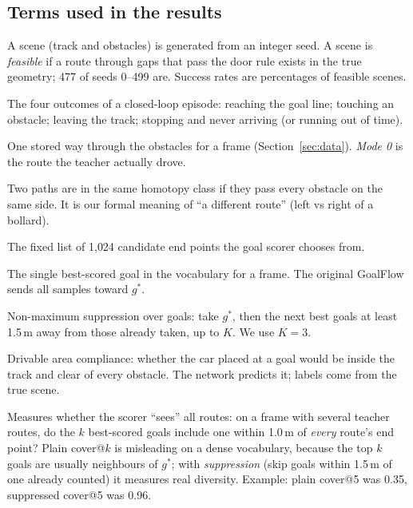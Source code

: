 \documentclass[11pt,a4paper]{article}
\begin{document}
\subsection{Terms used in the results}
\begin{description}[style=nextline,leftmargin=0pt]
  \item[Seed and feasible scene] A scene (track and obstacles) is generated from an integer seed. A scene is
        \emph{feasible} if a route through gaps that pass the door rule exists in the true geometry; 477 of
        seeds 0--499 are. Success rates are percentages of feasible scenes.
  \item[Success, collision, exit, stall] The four outcomes of a closed-loop episode: reaching the goal line;
        touching an obstacle; leaving the track; stopping and never arriving (or running out of time).
  \item[Mode, teacher route] One stored way through the obstacles for a frame (Section~\ref{sec:data}).
        \emph{Mode 0} is the route the teacher actually drove.
  \item[Homotopy] Two paths are in the same homotopy class if they pass every obstacle on the same side.
        It is our formal meaning of ``a different route'' (left vs right of a bollard).
  \item[Goal vocabulary] The fixed list of 1{,}024 candidate end points the goal scorer chooses from.
  \item[$g^*$ (``g-star'')] The single best-scored goal in the vocabulary for a frame. The original GoalFlow
        sends all samples toward $g^*$.
  \item[NMS-K] Non-maximum suppression over goals: take $g^*$, then the next best goals at least 1.5\,m away
        from those already taken, up to $K$. We use $K=3$.
  \item[DAC] Drivable area compliance: whether the car placed at a goal would be inside the track and clear
        of every obstacle. The network predicts it; labels come from the true scene.
  \item[cover@$k$] Measures whether the scorer ``sees'' all routes: on a frame with several teacher routes,
        do the $k$ best-scored goals include one within 1.0\,m of \emph{every} route's end point? Plain cover@$k$
        is misleading on a dense vocabulary, because the top $k$ goals are usually neighbours of $g^*$; with
        \emph{suppression} (skip goals within 1.5\,m of one already counted) it measures real diversity.
        Example: plain cover@5 was 0.35, suppressed cover@5 was 0.96.

\end{description}
\end{document}
